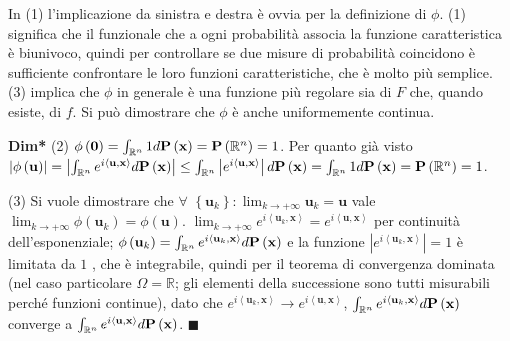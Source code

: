 \documentclass{article}
\begin{document}
In (1) l'implicazione da sinistra e destra \`{e} ovvia per la definizione di 
$\phi $. (1) significa che il funzionale che a ogni probabilit\`{a} associa
la funzione caratteristica \`{e} biunivoco, quindi per controllare se due
misure di probabilit\`{a} coincidono \`{e} sufficiente confrontare le loro
funzioni caratteristiche, che \`{e} molto pi\`{u} semplice. (3) implica che $\phi $ in
generale \`{e} una funzione pi\`{u} regolare sia di $F$ che, quando esiste,
di $f$. Si pu\`{o} dimostrare che $\phi $ \`{e} anche uniformemente continua.

\textbf{Dim*} (2) $\phi \left( \mathbf{0}\right) =\int_{%
\mathbb{R}
^{n}}1d\mathbf{P}\left( \mathbf{x}\right) =\mathbf{P}\left( 
\mathbb{R}
^{n}\right) =1$. Per quanto gi\`{a} visto $\left\vert \phi \left( \mathbf{u}%
\right) \right\vert =\left\vert \int_{%
\mathbb{R}
^{n}}e^{i\left\langle \mathbf{u},\mathbf{x}\right\rangle }d\mathbf{P}\left( 
\mathbf{x}\right) \right\vert \leq \int_{%
\mathbb{R}
^{n}}\left\vert e^{i\left\langle \mathbf{u},\mathbf{x}\right\rangle
}\right\vert d\mathbf{P}\left( \mathbf{x}\right) =\int_{%
\mathbb{R}
^{n}}1d\mathbf{P}\left( \mathbf{x}\right) =\mathbf{P}\left( 
\mathbb{R}
^{n}\right) =1$.

(3) Si vuole dimostrare che $\forall $ $\left\{ \mathbf{u}_{k}\right\}
:\lim_{k\rightarrow +\infty }\mathbf{u}_{k}=\mathbf{u}$ vale $%
\lim_{k\rightarrow +\infty }\phi \left( \mathbf{u}_{k}\right) =\phi \left( 
\mathbf{u}\right) $. $\lim_{k\rightarrow +\infty }e^{i\left\langle \mathbf{u}%
_{k}\mathbf{,x}\right\rangle }=e^{i\left\langle \mathbf{u,x}\right\rangle }$
per continuit\`{a} dell'esponenziale; $\phi \left( \mathbf{u}_{k}\right)
=\int_{%
\mathbb{R}
^{n}}e^{i\left\langle \mathbf{u}_{k},\mathbf{x}\right\rangle }d\mathbf{P}%
\left( \mathbf{x}\right) $ e la funzione $\left\vert e^{i\left\langle 
\mathbf{u}_{k},\mathbf{x}\right\rangle }\right\vert =1$ \`{e} limitata da $1$%
, che \`{e} integrabile, quindi per il teorema di convergenza dominata (nel
caso particolare $\Omega =%
\mathbb{R}
$; gli elementi della successione sono tutti misurabili perch\'{e} funzioni
continue), dato che $e^{i\left\langle \mathbf{u}_{k},\mathbf{x}\right\rangle
}\rightarrow e^{i\left\langle \mathbf{u},\mathbf{x}\right\rangle }$, $\int_{%
\mathbb{R}
^{n}}e^{i\left\langle \mathbf{u}_{k},\mathbf{x}\right\rangle }d\mathbf{P}%
\left( \mathbf{x}\right) $ converge a $\int_{%
\mathbb{R}
^{n}}e^{i\left\langle \mathbf{u},\mathbf{x}\right\rangle }d\mathbf{P}\left( 
\mathbf{x}\right) $. $\blacksquare $
\end{document}
